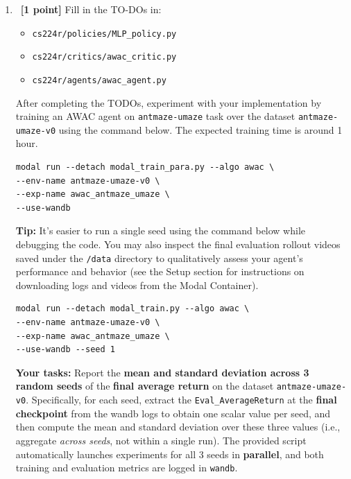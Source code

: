 \documentclass[12pt]{article}
\begin{document}
\begin{enumerate}
\item~\textbf{[1 point]} Fill in the TO-DOs in:
\begin{itemize}
    \item \texttt{cs224r/policies/MLP\_policy.py}
    \item \texttt{cs224r/critics/awac\_critic.py}
    \item \texttt{cs224r/agents/awac\_agent.py}
\end{itemize}

After completing the TODOs, experiment with your implementation by training an AWAC agent on \texttt{antmaze-umaze} task over the dataset \texttt{antmaze-umaze-v0} using the command below. The expected training time is around 1 hour.

\begin{tcolorbox}[width=\linewidth, sharp corners=all, colback=white!95!black]
\begin{verbatim}
modal run --detach modal_train_para.py --algo awac \
--env-name antmaze-umaze-v0 \
--exp-name awac_antmaze_umaze \
--use-wandb
\end{verbatim}
\end{tcolorbox}

\textbf{Tip:} It’s easier to run a single seed using the command below while debugging the code.  You may also inspect the final evaluation rollout videos saved under the \texttt{/data} directory to qualitatively assess your agent’s performance and behavior (see the Setup section for instructions on downloading logs and videos from the Modal Container).

\begin{tcolorbox}[width=\linewidth, sharp corners=all, colback=white!95!black]
\begin{verbatim}
modal run --detach modal_train.py --algo awac \
--env-name antmaze-umaze-v0 \
--exp-name awac_antmaze_umaze \
--use-wandb --seed 1
\end{verbatim}
\end{tcolorbox}

\textbf{Your tasks:} Report the \textbf{mean and standard deviation across 3 random seeds} of the \textbf{final average return} on the dataset \texttt{antmaze-umaze-v0}. Specifically, for each seed, extract the \texttt{Eval\_AverageReturn} at the \textbf{final checkpoint} from the wandb logs to obtain one scalar value per seed, and then compute the mean and standard deviation over these three values (i.e., aggregate \emph{across seeds}, not within a single run). The provided script automatically launches experiments for all 3 seeds in \textbf{parallel}, and both training and evaluation metrics are logged in \texttt{wandb}. 


\end{enumerate}
\end{document}
